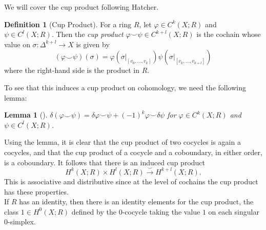 \documentclass[reqno]{amsart}
\newtheorem{lemma}[theorem]{Lemma}
\theoremstyle{definition}
\newtheorem{definition}[theorem]{Definition}
\theoremstyle{remark}
\begin{document}
    We will cover the cup product following Hatcher.\\

    \begin{definition}[Cup Product]
        For a ring $R$, let
        $\varphi \in C^{k}(X;R)$ and
        $\psi \in C^{l}(X;R)$. Then
        the \textit{cup product}
        $\varphi \smile \psi \in C^{k+l}(X;R)$ is the cochain
        whose value
        on $\sigma \colon \Delta^{k+l} \to X$ is given
        by
        \[
            \left( \varphi \smile \psi  \right) (\sigma)
            = \varphi \left( \sigma |_{\left[ v_0,\ldots,
            v_k \right] } \right) 
            \psi \left( \sigma|_{\left[ v_k,\ldots,
            v_{k+l} \right] } \right) 
        \] 
        where the right-hand side is the product
        in $R$.
    \end{definition}

    To see that this induces a
    cup product on cohomology, we
    need the following lemma:

    \begin{lemma}[]
        $\delta \left( \varphi \smile
        \psi \right) = 
        \delta \varphi \smile \psi +
        (-1)^{k} \varphi \smile \delta \psi $ 
        for $\varphi \in C^{k}(X;R)$ and
        $\psi \in C^{l}(X;R)$.
    \end{lemma}

    Using the lemma, it is clear
    that the cup product
    of two cocycles is again a cocycles, and
    that the cup product of a
    cocycle and a coboundary, in either order,
    is a coboundary.
    It follows that there is an induced cup product
    \[
    H^{k}(X;R) \times H^{l}(X;R)
    \stackrel{\smile}{\to} H^{k+l}(X;R).
    \] 
    This is associative and distributive since at the level
    of cochains the cup product has these properties.\\
    If $R$ has an identity, then there is an identity
    elements for the cup product, the class
    $1 \in H^{0}(X;R)$ defined by the
    $0$-cocycle taking the value $1$ on each singular
    $0$-simplex.
\end{document}
